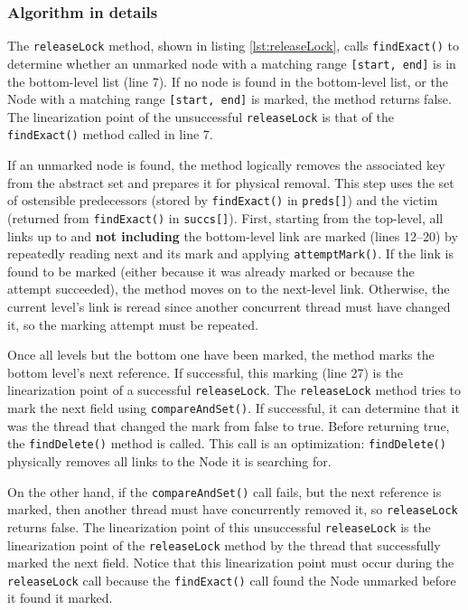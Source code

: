 \subsubsection*{Algorithm in details}

The \texttt{releaseLock} method, shown in listing \ref{lst:releaseLock}, calls \texttt{findExact()} to determine whether an unmarked node with a matching range \texttt{[start, end]} is in the bottom-level list (line 7). 
If no node is found in the bottom-level list, or the Node with a matching range \texttt{[start, end]} is marked, the method returns false. 
The linearization point of the unsuccessful \texttt{releaseLock} is that of the \texttt{findExact()} method called in line 7. 

If an unmarked node is found, the method logically removes the associated key from the abstract set and prepares it for physical removal. 
This step uses the set of ostensible predecessors (stored by \texttt{findExact()} in \texttt{preds[]}) and the victim (returned from \texttt{findExact()} in \texttt{succs[]}). 
First, starting from the top-level, all links up to and \textbf{not including} the bottom-level link are marked (lines 12--20) by repeatedly reading next and its mark and applying \texttt{attemptMark()}. 
If the link is found to be marked (either because it was already marked or because the attempt succeeded), the method moves on to the next-level link. 
Otherwise, the current level's link is reread since another concurrent thread must have changed it, so the marking attempt must be repeated. 

Once all levels but the bottom one have been marked, the method marks the bottom level's next reference. 
If successful, this marking (line 27) is the linearization point of a successful \texttt{releaseLock}. The \texttt{releaseLock} method tries to mark the next field using \texttt{compareAndSet()}. 
If successful, it can determine that it was the thread that changed the mark from false to true. Before returning true, the \texttt{findDelete()} method is called. This call is an optimization: \texttt{findDelete()} physically removes all links to the Node it is searching for.

On the other hand, if the  \texttt{compareAndSet()} call fails, but the next reference is marked, then another thread must have concurrently removed it, so \texttt{releaseLock} returns false. 
The linearization point of this unsuccessful \texttt{releaseLock} is the linearization point of the \texttt{releaseLock} method by the thread that successfully marked the next field. 
Notice that this linearization point must occur during the \texttt{releaseLock} call because the \texttt{findExact()} call found the Node unmarked before it found it marked.

